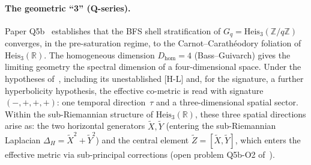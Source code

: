 \documentclass[11pt,a4paper]{article}
\newcommand{\Heis}{\mathrm{Heis}_3}
\newcommand{\Dhom}{D_{\mathrm{hom}}}
\begin{document}
      \paragraph{The geometric ``3'' (Q-series).}
        Paper Q5b~\cite{Beau2026q5b} establishes that the BFS shell stratification of
        $G_q = \Heis(\mathbb{Z}/q\mathbb{Z})$ converges, in the pre-saturation regime, to the
        Carnot--Carath\'eodory foliation of $\Heis(\mathbb{R})$.
        The homogeneous dimension $\Dhom = 4$ (Bass--Guivarch) gives the limiting geometry the
        spectral dimension of a four-dimensional space.
        Under the hypotheses of~\cite{Beau2026q5b}, including its unestablished [H-L] and, for the
        signature, a further hyperbolicity hypothesis, the effective co-metric is read with
        signature $(-,+,+,+)$: one temporal direction~$\tau$ and a three-dimensional spatial
        sector.
        Within the sub-Riemannian structure of $\Heis(\mathbb{R})$, these three spatial directions
        arise as: the two horizontal generators $\tilde X, \tilde Y$ (entering the sub-Riemannian
        Laplacian $\Delta_H = \tilde X^2 + \tilde Y^2$) and the central element
        $\tilde Z = [\tilde X, \tilde Y]$, which enters the effective metric via sub-principal
        corrections (open problem Q5b-O2 of~\cite{Beau2026q5b}).
\end{document}
